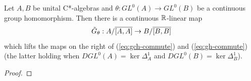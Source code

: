\documentclass[12pt]{amsart}
\begin{document}
\begin{prop}\label{prop:gl-G-theta-lift}
Let $A,B$ be unital C*-algebras and $\theta: GL^0(A) \to GL^0(B)$ be a continuous group homomorphism. Then there is a continuous $\mathbb{R}$-linear map
\begin{equation}
\tilde{G}_\theta: A/\overline{[A,A]} \to B/\overline{[B,B]}
\end{equation}
which lifts the maps on the right of  (\ref{eq:gch-commute}) and (\ref{eq:gh-commute}) (the latter holding when $DGL^0(A) = \ker\Delta_A^1$ and $DGL^0(B) = \ker\Delta_B^1$).
\begin{proof}

\end{proof}
\end{prop}
\end{document}
